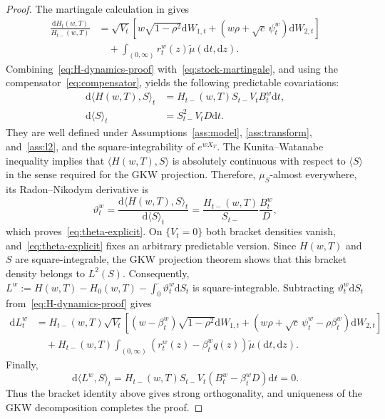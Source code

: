 \documentclass[11pt]{article}
\theoremstyle{definition}
\theoremstyle{remark}
\newcommand{\1}{\mathbf{1}}
\newcommand{\mut}{\widetilde\mu}
\newcommand{\dd}{\mathrm{d}}
\begin{document}
\begin{proof}
The martingale calculation in \citet[Theorem~3.3]{bondi2024} gives
\begin{align}
 \frac{\dd H_t(w,T)}{H_{t-}(w,T)}
 &=\sqrt{V_t}\left[
    w\sqrt{1-\rho^2}\dd W_{1,t}
   +(w\rho+\sqrt c\,\psi_t^w)\dd W_{2,t}
   \right]
\nonumber\\
&\quad+\int_{(0,\infty)}r_t^w(z)\mut(\dd t,\dd z).
\label{eq:H-dynamics-proof}
\end{align}
Combining~\eqref{eq:H-dynamics-proof} with~\eqref{eq:stock-martingale}, and
using the compensator~\eqref{eq:compensator}, yields the following predictable
covariations:
\begin{align}
 \dd\langle H(w,T),S\rangle_t
 &=H_{t-}(w,T)S_{t-}V_tB_t^w\dd t,
 \label{eq:cross-bracket-proof}\\
 \dd\langle S\rangle_t
 &=S_{t-}^2V_tD\dd t.
 \label{eq:S-bracket-proof}
\end{align}
They are well defined under Assumptions~\ref{ass:model},
\ref{ass:transform}, and~\ref{ass:l2}, and the square-integrability of
$e^{wX_T}$. The Kunita--Watanabe inequality implies
that $\langle H(w,T),S\rangle$ is absolutely continuous with respect to
$\langle S\rangle$ in the sense required for the GKW projection. Therefore,
$\mu_S$-almost everywhere, its Radon--Nikodym derivative is
\[
 \vartheta_t^w
 =\frac{\dd\langle H(w,T),S\rangle_t}
        {\dd\langle S\rangle_t}
 =\frac{H_{t-}(w,T)}{S_{t-}}\frac{B_t^w}{D},
\]
which proves~\eqref{eq:theta-explicit}. On $\{V_t=0\}$ both bracket densities
vanish, and~\eqref{eq:theta-explicit} fixes an arbitrary predictable version.
Since $H(w,T)$ and $S$ are square-integrable, the GKW projection theorem
shows that this bracket density belongs to $L^2(S)$. Consequently,
$L^w:=H(w,T)-H_0(w,T)-\int_0^\cdot\vartheta_t^w\dd S_t$ is
square-integrable. Subtracting $\vartheta_t^w\dd S_t$
from~\eqref{eq:H-dynamics-proof} gives
\begin{align}
\dd L_t^w
&=H_{t-}(w,T)\sqrt{V_t}
  \left[
   (w-\beta_t^w)\sqrt{1-\rho^2}\dd W_{1,t}
   +(w\rho+\sqrt c\,\psi_t^w-\rho\beta_t^w)\dd W_{2,t}
  \right]
\nonumber\\
&\quad+H_{t-}(w,T)\int_{(0,\infty)}
       \left(r_t^w(z)-\beta_t^wq(z)\right)\mut(\dd t,\dd z).
\label{eq:residual-dynamics}
\end{align}
Finally,
\[
 \dd\langle L^w,S\rangle_t
 =H_{t-}(w,T)S_{t-}V_t(B_t^w-\beta_t^wD)\dd t=0.
\]
Thus the bracket identity above gives strong orthogonality, and uniqueness of
the GKW decomposition completes the proof.
\end{proof}
\end{document}
